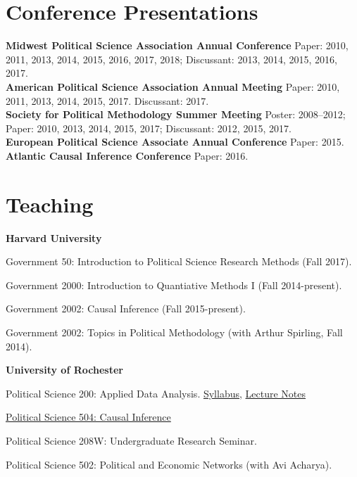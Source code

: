 \documentclass[margin,line,12pt]{res}
\newenvironment{list1}{
  \begin{list}{\ding{113}}{%
      \setlength{\itemsep}{0in}
      \setlength{\parsep}{0in} \setlength{\parskip}{0in}
      \setlength{\topsep}{0in} \setlength{\partopsep}{0in} 
      \setlength{\leftmargin}{0.83 cm}}}{\end{list}}
\begin{document}
\begin{resume}
\section{\textsf{\sc Conference Presentations}}
{\bf Midwest Political Science Association Annual Conference} Paper: 2010, 2011, 2013, 2014, 2015, 2016, 2017, 2018; Discussant: 2013, 2014, 2015, 2016, 2017.\\
{\bf American Political Science Association Annual Meeting} Paper: 2010, 2011, 2013, 2014, 2015, 2017. Discussant: 2017.\\
{\bf Society for Political Methodology Summer Meeting} Poster: 2008--2012; Paper: 2010, 2013, 2014, 2015, 2017; Discussant: 2012, 2015, 2017.\\
{\bf European Political Science Associate Annual Conference} Paper: 2015.\\ 
{\bf Atlantic Causal Inference Conference} Paper: 2016. \\

\section{\textsf{\sc Teaching}}
{\bf Harvard University}
\begin{list1}
  \item[] Government 50: Introduction to Political Science Research Methods (Fall 2017).
\item[] Government 2000: Introduction to Quantiative Methods I (Fall 2014-present).
\item[] Government 2002: Causal Inference (Fall 2015-present).
\item[] Government 2002: Topics in Political Methodology (with Arthur Spirling, Fall 2014).
\end{list1}

{\bf University of Rochester}
\begin{list1}
\item[] Political Science 200: Applied Data Analysis. \href{http://www.mattblackwell.org/files/teaching/psc200-syllabus.pdf}{Syllabus}, \href{http://www.mattblackwell.org/files/teaching/psc200-notes.pdf}{Lecture Notes}
\item[] \href{http://www.mattblackwell.org/teaching/psc504/}{Political Science 504: Causal Inference}
\item[] Political Science 208W: Undergraduate Research Seminar.
\item[] Political Science 502: Political and Economic Networks (with Avi Acharya).
\end{list1}


\end{resume}
\end{document}
